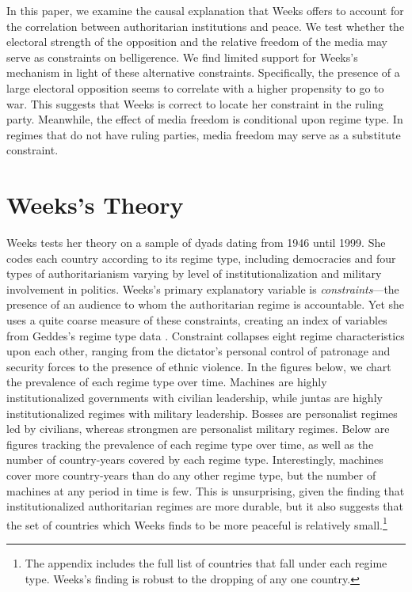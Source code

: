 \documentclass[12pt]{article}
\begin{document}
\par In this paper, we examine the causal explanation that Weeks offers to account for the correlation between authoritarian institutions and peace. We test whether the electoral strength of the opposition and the relative freedom of the media may serve as constraints on belligerence. We find limited support for Weeks's mechanism in light of these alternative constraints. Specifically, the presence of a large electoral opposition seems to correlate with a higher propensity to go to war. This suggests that Weeks is correct to locate her constraint in the ruling party. Meanwhile, the effect of media freedom is conditional upon regime type. In regimes that do not have ruling parties, media freedom may serve as a substitute constraint. 

\section{Weeks's Theory}

\par Weeks tests her theory on a sample of dyads dating from 1946 until 1999. She codes each country according to its regime type, including democracies and four types of authoritarianism varying by level of institutionalization and military involvement in politics. Weeks's primary explanatory variable is \textit{constraints}---the presence of an audience to whom the authoritarian regime is accountable. Yet she uses a quite coarse measure of these constraints, creating an index of variables from Geddes's regime type data \autocite[Appendix A]{geddes:2003}. Constraint collapses eight regime characteristics upon each other, ranging from the dictator's personal control of patronage and security forces to the presence of ethnic violence. In the figures below, we chart the prevalence of each regime type over time. Machines are highly institutionalized governments with civilian leadership, while juntas are highly institutionalized regimes with military leadership. Bosses are personalist regimes led by civilians, whereas strongmen are personalist military regimes. Below are figures tracking the prevalence of each regime type over time, as well as the number of country-years covered by each regime type. Interestingly, machines cover more country-years than do any other regime type, but the number of machines at any period in time is few. This is unsurprising, given the finding that institutionalized authoritarian regimes are more durable, but it also suggests that the set of countries which Weeks finds to be more peaceful is relatively small.\footnote{The appendix includes the full list of countries that fall under each regime type. Weeks's finding is robust to the dropping of any one country.} 
\end{document}
